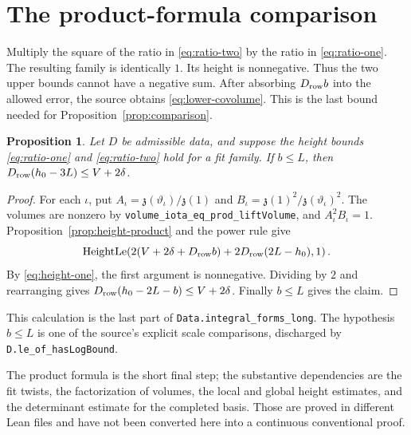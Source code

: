\documentclass[11pt,oneside,openany]{amsbook}
\newtheorem{proposition}[theorem]{Proposition}
\theoremstyle{remark}
\numberwithin{equation}{section}
\begin{document}
\section{The product-formula comparison}
Multiply the square of the ratio in
\eqref{eq:ratio-two} by the ratio in
\eqref{eq:ratio-one}. The resulting family is identically
$1$. Its height is nonnegative. Thus the two upper bounds
cannot have a negative sum. After absorbing
$D_{\rm row}b$ into the allowed error, the source obtains
\eqref{eq:lower-covolume}. This is the last bound needed
for Proposition~\ref{prop:comparison}.

\begin{proposition}
\label{prop:height-comparison}
Let $D$ be admissible data, and suppose the height
bounds \eqref{eq:ratio-one} and \eqref{eq:ratio-two}
hold for a fit family. If $b\le L$, then
$D_{\rm row}(h_0-3L)\le V+2\delta$.
\end{proposition}
\begin{proof}
For each $\iota$, put
$A_\iota=\mathfrak z(\vartheta_\iota)/\mathfrak z(1)$
and $B_\iota=\mathfrak z(1)^2/
\mathfrak z(\vartheta_\iota)^2$. The volumes are nonzero
by \texttt{volume\_iota\_eq\_prod\_liftVolume}, and
$A_\iota^2B_\iota=1$. Proposition~\ref{prop:height-product}
and the power rule give
\[
\operatorname{HeightLe}\!\left(
  2(V+2\delta+D_{\rm row}b)
   +2D_{\rm row}(2L-h_0),1\right).
\]
By \eqref{eq:height-one}, the first argument is
nonnegative. Dividing by $2$ and rearranging gives
$D_{\rm row}(h_0-2L-b)\le V+2\delta$.
Finally $b\le L$ gives the claim.
\end{proof}
This calculation is the last part of
\texttt{Data.integral\_forms\_long}. The hypothesis
$b\le L$ is one of the source's explicit scale
comparisons, discharged by \texttt{D.le\_of\_hasLogBound}.

The product formula is the short final step; the substantive
dependencies are the fit twists, the factorization of volumes,
the local and global height estimates, and the determinant
estimate for the completed basis. Those are proved in
different Lean files and have not been converted here into a
continuous conventional proof.
\end{document}
